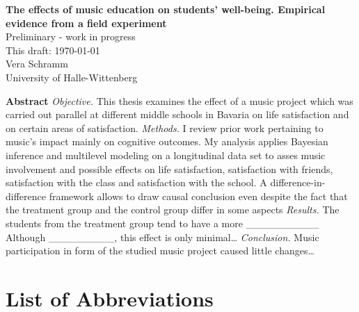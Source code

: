 \documentclass[a4, 12pt]{article}
\begin{document}
\begin{titlepage}
\thispagestyle{empty}%
\begin{center}
\renewcommand{\baselinestretch}{1.0}\normalsize %
\textbf{
The effects of music education on students' well-being. Empirical evidence from a field experiment}\\[1cm]
Preliminary - work in progress \\[1cm]
This draft: \today \\[1cm]
Vera Schramm \\
University of Halle-Wittenberg \\[0.75cm]
 \end{center}


\end{titlepage}

\setcounter{page}{2}

\renewcommand{\baselinestretch}{1}\normalsize

\textbf{\normalsize Abstract}
\emph{Objective.} This thesis examines the effect of a music project which was carried out parallel at different middle schools in Bavaria on life satisfaction and on certain areas of satisfaction. \emph{Methods.} I review prior work pertaining to music's impact mainly on cognitive outcomes. My analysis applies Bayesian inference and multilevel modeling on a longitudinal data set to asses music involvement and possible effects on life satisfaction, satisfaction with friends, satisfaction with the class and satisfaction with the school. A difference-in-difference framework allows to draw causal conclusion even despite the fact that the treatment group and the control group differ in some aspects \emph{Results.} The students from the treatment group tend to have a more \_\_\_\_\_\_\_\_\_\_ Although \_\_\_\_\_\_\_\_\_, this effect is only minimal\ldots{} \emph{Conclusion.} Music participation in form of the studied music project caused little changes\ldots{}

\clearpage
\tableofcontents

\clearpage
\doublespacing

\hypertarget{list-of-abbreviations}{%
\section*{List of Abbreviations}\label{list-of-abbreviations}}
\end{document}
